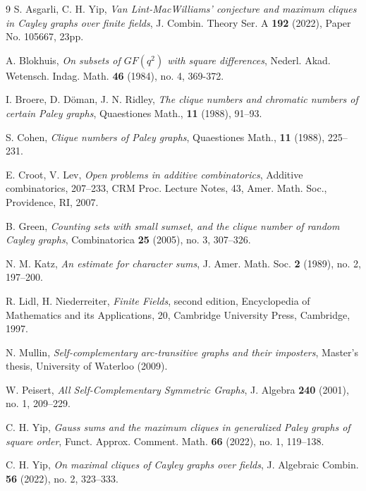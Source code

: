 \documentclass[12pt,reqno]{amsart}
\begin{document}
\begin{thebibliography}{9}
S. Asgarli, C. H. Yip,
\emph{Van Lint-MacWilliams' conjecture and maximum cliques in Cayley graphs over finite fields},
J. Combin. Theory Ser. A \textbf{192} (2022), Paper No. 105667, 23pp.

A. Blokhuis,
\emph{On subsets of $GF(q^2)$ with square differences},
Nederl. Akad. Wetensch. Indag. Math. \textbf{46} (1984), no. 4, 369-372. 

I. Broere, D. Döman, J. N. Ridley, 
\emph{The clique numbers and chromatic numbers of certain Paley graphs},
Quaestiones Math., \textbf{11} (1988), 91--93.

S. Cohen,
\emph{Clique numbers of Paley graphs},
Quaestiones Math., \textbf{11} (1988), 225--231.

E. Croot, V. Lev,
\emph{Open problems in additive combinatorics},
Additive combinatorics, 207--233, CRM Proc. Lecture Notes, 43, Amer. Math. Soc., Providence, RI, 2007. 

B. Green, 
\emph{Counting sets with small sumset, and the clique number of random Cayley graphs},
Combinatorica \textbf{25} (2005), no. 3, 307--326.

N. M. Katz, 
\emph{An estimate for character sums}, 
J. Amer. Math. Soc. \textbf{2} (1989), no. 2, 197--200.

R. Lidl, H. Niederreiter,
\emph{Finite Fields}, 
second edition, Encyclopedia of Mathematics and its Applications, 20, Cambridge University Press, Cambridge, 1997. 

N. Mullin,
\emph{Self-complementary arc-transitive graphs and their imposters}, 
Master's thesis, University of Waterloo (2009).

W. Peisert,
\emph{All Self-Complementary Symmetric Graphs},
J. Algebra \textbf{240} (2001), no. 1, 209--229.

C. H. Yip, \emph{Gauss sums and the maximum cliques in generalized Paley graphs of square order},
Funct. Approx. Comment. Math. \textbf{66} (2022), no. 1, 119--138. 

C. H. Yip,
\emph{On maximal cliques of Cayley graphs over fields},
J. Algebraic Combin. \textbf{56} (2022), no. 2, 323--333.

\end{thebibliography}
\end{document}
